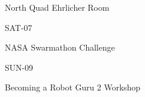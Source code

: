 \documentclass{article}
\begin{document}
\rssheader[1in]

\fontsize{32pt}{36pt}
\selectfont
\begin{center}
North Quad Ehrlicher Room
\end{center}

\vfill

\fontsize{48pt}{56pt}
\selectfont
\begin{center}
SAT-07
\end{center}

\fontsize{24pt}{28pt}
\selectfont
\begin{center}
NASA Swarmathon Challenge
\end{center}

\vfill

\fontsize{48pt}{56pt}
\selectfont
\begin{center}
SUN-09
\end{center}

\fontsize{24pt}{24pt}
\selectfont
\begin{center}
Becoming a Robot Guru 2 Workshop
\end{center}

\vfill
\end{document}
